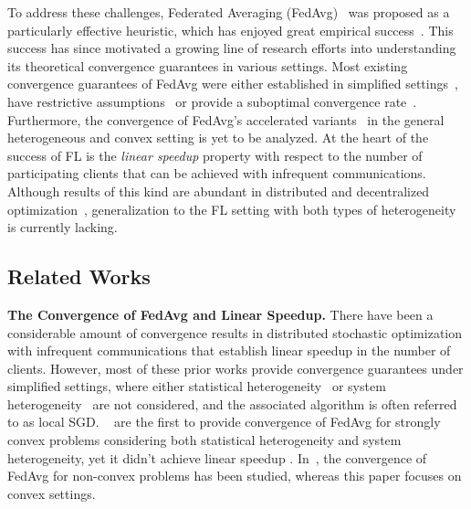 To address these challenges, Federated Averaging (FedAvg)~\cite{mcmahan2016communication} was proposed as a particularly effective heuristic, which has enjoyed great empirical success~\cite{47586}. This success has since motivated a growing line of research efforts into understanding its theoretical convergence guarantees in various settings. Most existing convergence guarantees of FedAvg were either established in simplified settings~\cite{stich2018local,khaled2019first,wang2018cooperative,yu2019parallel,khaled2020tighter,li2018federated,koloskova2020unified}, have restrictive assumptions~\cite{haddadpour2019convergence} or provide a suboptimal 
convergence rate~\cite{li2019convergence}. Furthermore, the convergence of
FedAvg's accelerated variants~\cite{yu2019linear,huo2020faster,liu2019accelerating} in the general heterogeneous and convex setting is yet to be analyzed. At the heart of the success of FL is the \emph{linear speedup} property with respect to the number of participating clients that can be achieved with infrequent communications. Although results of this kind are abundant in distributed and decentralized optimization~\cite{yu2019linear,yu2019parallel,stich2018local,khaled2020tighter,stich2018local,koloskova2020unified}, generalization to the FL setting with both types of heterogeneity is currently lacking.

\subsection{Related Works}
\textbf{The Convergence of FedAvg and Linear Speedup.}
There have been a considerable amount of convergence results in distributed stochastic optimization with infrequent communications that establish linear speedup in the number of clients. However, most of these prior works provide
convergence guarantees under simplified settings, where either statistical
heterogeneity~\cite{stich2018local,zhou2017convergence,wang2018cooperative,woodworth2018graph,haddadpour2019convergence} or system
heterogeneity~\cite{yu2019parallel,wang2019adaptive,khaled2019first,jiang2018linear} are not
considered, and the associated algorithm is often referred to as local SGD. ~\cite{li2019convergence} are the first to provide convergence of FedAvg for strongly convex problems considering both statistical heterogeneity and system heterogeneity, yet it
didn't achieve linear speedup \cite{yu2019parallel,haddadpour2019convergence,stich2018local}. In~\cite{haddadpour2019convergence,liang2019variance,huo2020faster,jiang2018linear}, the convergence of FedAvg for non-convex problems has been studied, whereas this paper focuses on convex settings.
\begin{comment}
However, \cite{huo2020faster} did not discuss the linear speedup and the theorems in \cite{haddadpour2019convergence,liang2019variance} failed to cover the accelerated version of
FedAvg. 
\end{comment}

